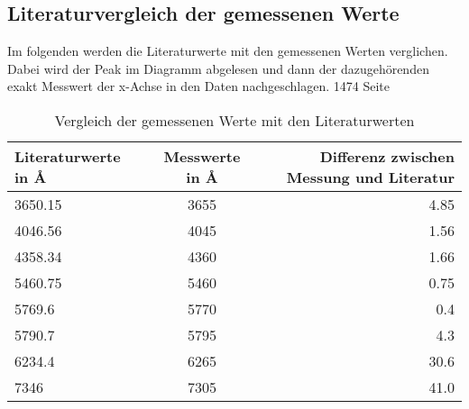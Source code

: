 \subsection{Literaturvergleich der gemessenen Werte} \label{Messlit}

Im folgenden werden die Literaturwerte \cite[S. 1474]{Lamport1995} mit den gemessenen Werten verglichen. Dabei wird der Peak im Diagramm abgelesen und dann der dazugehörenden 
exakt Messwert der x-Achse in den Daten nachgeschlagen.
1474 Seite
\begin{table}[h]
    \centering
    \begin{tabular}[h]{l|c|r}


        Literaturwerte in \r{A} & Messwerte in \r{A} & Differenz zwischen Messung und Literatur \\
       \hline
       3650.15  & 3655 & 4.85\\
       4046.56  & 4045 & 1.56\\
       4358.34 & 4360 & 1.66 \\
       5460.75 & 5460 & 0.75 \\
       5769.6  & 5770 & 0.4 \\
       5790.7  & 5795 & 4.3 \\
       6234.4  & 6265 & 30.6 \\
       7346  & 7305 & 41.0 \\
\end{tabular}
    \caption{Vergleich der gemessenen Werte mit den Literaturwerten}
\end{table}